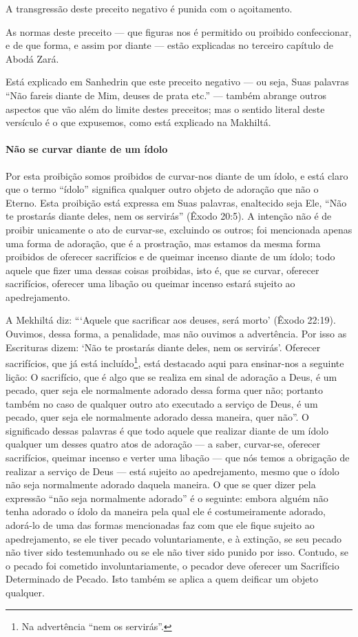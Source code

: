 A transgressão deste preceito negativo é punida com o açoitamento.

As normas deste preceito --- que figuras nos é permitido ou proibido
confeccionar, e de que forma, e assim por diante --- estão explicadas no
terceiro capítulo de Abodá Zará.

Está explicado em Sanhedrin que este preceito negativo --- ou seja, Suas
palavras ``Não fareis diante de Mim, deuses de prata etc.'' --- também
abrange outros aspectos que vão além do limite destes preceitos; mas o
sentido literal deste versículo é o que expusemos, como está explicado
na Makhiltá.

\paragraph{Não se curvar diante de um ídolo}

Por esta proibição somos proibidos de curvar-nos diante de um ídolo, e
está claro que o termo ``ídolo'' significa qualquer outro objeto de
adoração que não o Eterno. Esta proibição está expressa em Suas
palavras, enaltecido seja Ele, ``Não te prostarás diante deles, nem os
servirás'' (Êxodo 20:5). A intenção não é de proibir unicamente o ato de
curvar-se, excluindo os outros; foi mencionada apenas uma forma de
adoração, que é a prostração, mas estamos da mesma forma proibidos de
oferecer sacrifícios e de queimar incenso diante de um ídolo; todo
aquele que fizer uma dessas coisas proibidas, isto é, que se curvar,
oferecer sacrifícios, oferecer uma libação ou queimar incenso estará
sujeito ao apedrejamento.

A Mekhiltá diz: ```Aquele que sacrificar aos deuses, será morto' (Êxodo
22:19). Ouvimos, dessa forma, a penalidade, mas não ouvimos a
advertência. Por isso as Escrituras dizem: `Não te prostarás diante
deles, nem os servirás'.
Oferecer sacrifícios, que já está incluído\footnote{Na advertência ``nem os servirás''.}, está
destacado aqui para ensinar-nos a seguinte lição: O sacrifício, que é
algo que se realiza em sinal de adoração a Deus, é um pecado, quer seja
ele normalmente adorado dessa forma quer não; portanto também no caso de
qualquer outro ato executado a serviço de Deus, é um pecado, quer seja
ele normalmente adorado dessa maneira, quer não''. O significado dessas
palavras é que todo aquele que realizar diante de um ídolo qualquer um
desses quatro atos de adoração --- a saber, curvar-se, oferecer
sacrifícios, queimar incenso e verter uma libação --- que nós temos a
obrigação de realizar a serviço de Deus --- está sujeito ao
apedrejamento, mesmo que o ídolo não seja normalmente adorado daquela
maneira. O que se quer dizer pela expressão ``não seja normalmente
adorado'' é o seguinte: embora alguém não tenha adorado o ídolo da
maneira pela qual ele é costumeiramente adorado, adorá-lo de uma das
formas mencionadas faz com que ele fique sujeito ao apedrejamento, se
ele tiver pecado voluntariamente, e à extinção, se seu pecado não tiver
sido testemunhado ou se ele não tiver sido punido por isso. Contudo, se
o pecado foi cometido involuntariamente, o pecador deve oferecer um
Sacrifício Determinado de Pecado. Isto também se aplica a quem deificar
um objeto qualquer.

